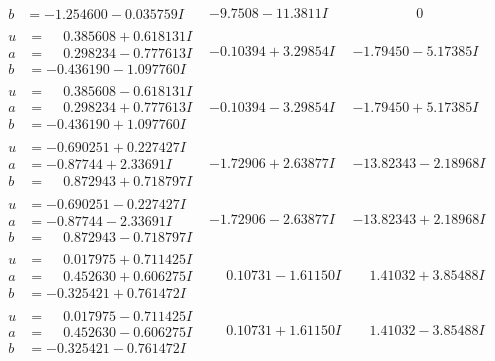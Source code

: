 \documentclass[1p]{elsarticle_modified}
\theoremstyle{definition}
\begin{document}
$$\begin{array}{c|c|c}
\begin{aligned}
b &= -1.254600 - 0.035759 I\end{aligned}
 & -9.7508 - 11.3811 I & \phantom{-0.000000 } 0 \\ \hline\begin{aligned}
u &= \phantom{-}0.385608 + 0.618131 I \\
a &= \phantom{-}0.298234 - 0.777613 I \\
b &= -0.436190 - 1.097760 I\end{aligned}
 & -0.10394 + 3.29854 I & -1.79450 - 5.17385 I \\ \hline\begin{aligned}
u &= \phantom{-}0.385608 - 0.618131 I \\
a &= \phantom{-}0.298234 + 0.777613 I \\
b &= -0.436190 + 1.097760 I\end{aligned}
 & -0.10394 - 3.29854 I & -1.79450 + 5.17385 I \\ \hline\begin{aligned}
u &= -0.690251 + 0.227427 I \\
a &= -0.87744 + 2.33691 I \\
b &= \phantom{-}0.872943 + 0.718797 I\end{aligned}
 & -1.72906 + 2.63877 I & -13.82343 - 2.18968 I \\ \hline\begin{aligned}
u &= -0.690251 - 0.227427 I \\
a &= -0.87744 - 2.33691 I \\
b &= \phantom{-}0.872943 - 0.718797 I\end{aligned}
 & -1.72906 - 2.63877 I & -13.82343 + 2.18968 I \\ \hline\begin{aligned}
u &= \phantom{-}0.017975 + 0.711425 I \\
a &= \phantom{-}0.452630 + 0.606275 I \\
b &= -0.325421 + 0.761472 I\end{aligned}
 & \phantom{-}0.10731 - 1.61150 I & \phantom{-}1.41032 + 3.85488 I \\ \hline\begin{aligned}
u &= \phantom{-}0.017975 - 0.711425 I \\
a &= \phantom{-}0.452630 - 0.606275 I \\
b &= -0.325421 - 0.761472 I\end{aligned}
 & \phantom{-}0.10731 + 1.61150 I & \phantom{-}1.41032 - 3.85488 I \\ \hline\begin{aligned}

\end{aligned}
\end{array}$$
\end{document}
